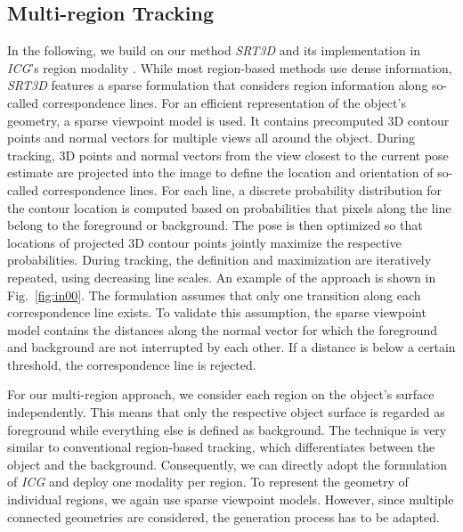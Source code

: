 \documentclass[letterpaper, 10 pt, conference]{ieeeconf}
\begin{document}
\subsection{Multi-region Tracking}\label{sec:c3}
In the following, we build on our method \textit{SRT3D} \cite{Stoiber2021} and its implementation in \textit{ICG}'s region modality \cite{Stoiber2022}.
While most region-based methods use dense information, \textit{SRT3D} features a sparse formulation that considers region information along so-called correspondence lines.
For an efficient representation of the object's geometry, a sparse viewpoint model is used.
It contains precomputed 3D contour points and normal vectors for multiple views all around the object.
During tracking, 3D points and normal vectors from the view closest to the current pose estimate are projected into the image to define the location and orientation of so-called correspondence lines.
For each line, a discrete probability distribution for the contour location is computed based on probabilities that pixels along the line belong to the foreground or background.
The pose is then optimized so that locations of projected 3D contour points jointly maximize the respective probabilities.
During tracking, the definition and maximization are iteratively repeated, using decreasing line scales.
An example of the approach is shown in Fig.~\ref{fig:in00}.
The formulation assumes that only one transition along each correspondence line exists.
To validate this assumption, the sparse viewpoint model contains the distances along the normal vector for which the foreground and background are not interrupted by each other.
If a distance is below a certain threshold, the correspondence line is rejected.

For our multi-region approach, we consider each region on the object's surface independently.
This means that only the respective object surface is regarded as foreground while everything else is defined as background.
The technique is very similar to conventional region-based tracking, which differentiates between the object and the background.
Consequently, we can directly adopt the formulation of \textit{ICG} \cite{Stoiber2022} and deploy one modality per region.
To represent the geometry of individual regions, we again use sparse viewpoint models.
However, since multiple connected geometries are considered, the generation process has to be adapted.
\end{document}
